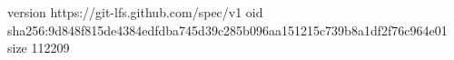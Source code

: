 version https://git-lfs.github.com/spec/v1
oid sha256:9d848f815de4384edfdba745d39c285b096aa151215c739b8a1df2f76c964e01
size 112209
